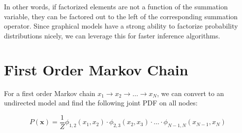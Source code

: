 \documentclass[a4paper,12pt]{report}
\begin{document}
In other words, if factorized elements are not a function of the summation variable, they can be factored out to the left of the corresponding summation operator. Since graphical models have a strong ability to factorize probability distributions nicely, we can leverage this for faster inference algorithms.

\section{First Order Markov Chain}

For a first order Markov chain $x_1 \to x_2 \to \dots \to x_N$, we can convert to an undirected model and find the following joint PDF on all nodes:

\begin{equation}
P(\pmb x) = \frac{1}{Z} \phi_{1,2}(x_1, x_2) \cdot \phi_{2,3}(x_2, x_3) \cdot \dots \cdot \phi_{N-1,N}(x_{N-1}, x_N)
\end{equation}
\end{document}
